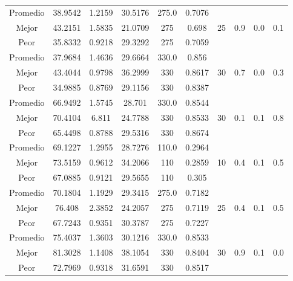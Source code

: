 \begin{table}[h!]
\begin{center}
\begin{tabular}{|c|c|c|c|c|c|c|c|c|c|}
            Promedio  & 38.9542 & 1.2159 & 30.5176 & 275.0 & 0.7076 &  &  &  & \\
            \cline{1-6}
            Mejor & 43.2151 & 1.5835  & 21.0709 & 275 & 0.698 & 25 & 0.9 & 0.0 & 0.1\\
            \cline{1-6}
            Peor & 35.8332 & 0.9218  & 29.3292 & 275 & 0.7059 &  &  &  & \\
        \hline
        \hline
            Promedio  & 37.9684 & 1.4636 & 29.6664 & 330.0 & 0.856 &  &  &  & \\
            \cline{1-6}
            Mejor & 43.4044 & 0.9798  & 36.2999 & 330 & 0.8617 & 30 & 0.7 & 0.0 & 0.3\\
            \cline{1-6}
            Peor & 34.9885 & 0.8769  & 29.1156 & 330 & 0.8387 &  &  &  & \\
        \hline
        \hline
            Promedio  & 66.9492 & 1.5745 & 28.701 & 330.0 & 0.8544 &  &  &  & \\
            \cline{1-6}
            Mejor & 70.4104 & 6.811  & 24.7788 & 330 & 0.8533 & 30 & 0.1 & 0.1 & 0.8\\
            \cline{1-6}
            Peor & 65.4498 & 0.8788  & 29.5316 & 330 & 0.8674 &  &  &  & \\
        \hline
        \hline
            Promedio  & 69.1227 & 1.2955 & 28.7276 & 110.0 & 0.2964 &  &  &  & \\
            \cline{1-6}
            Mejor & 73.5159 & 0.9612  & 34.2066 & 110 & 0.2859 & 10 & 0.4 & 0.1 & 0.5\\
            \cline{1-6}
            Peor & 67.0885 & 0.9121  & 29.5655 & 110 & 0.305 &  &  &  & \\
        \hline
        \hline
            Promedio  & 70.1804 & 1.1929 & 29.3415 & 275.0 & 0.7182 &  &  &  & \\
            \cline{1-6}
            Mejor & 76.408 & 2.3852  & 24.2057 & 275 & 0.7119 & 25 & 0.4 & 0.1 & 0.5\\
            \cline{1-6}
            Peor & 67.7243 & 0.9351  & 30.3787 & 275 & 0.7227 &  &  &  & \\
        \hline
        \hline
            Promedio  & 75.4037 & 1.3603 & 30.1216 & 330.0 & 0.8533 &  &  &  & \\
            \cline{1-6}
            Mejor & 81.3028 & 1.1408  & 38.1054 & 330 & 0.8404 & 30 & 0.9 & 0.1 & 0.0\\
            \cline{1-6}
            Peor & 72.7969 & 0.9318  & 31.6591 & 330 & 0.8517 &  &  &  & \\

\end{tabular}
\end{center}
\end{table}

